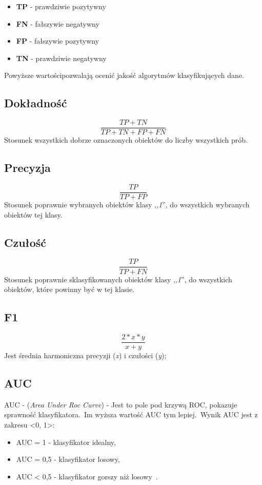     \begin{itemize}
        \item  \textbf{TP} - prawdziwie pozytywny
        \item \textbf{FN} - fałszywie negatywny
        \item \textbf{FP} - fałszywie pozytywny
        \item \textbf{TN} - prawdziwie negatywny
    \end{itemize}
Powyższe wartościpozwalają ocenić jakość algorytmów klasyfikujących dane.

\subsection{Dokładność}
\begin{equation}\label{math:acc}
    \frac{TP + TN}{TP + TN + FP + FN}
\end{equation}
Stosunek wszystkich dobrze oznaczonych obiektów do liczby wszystkich prób.

\subsection{Precyzja}
\begin{equation}\label{math:prec}
    \frac{TP}{TP + FP}
\end{equation}
Stosunek poprawnie wybranych obiektów klasy ,,\textit{1}'', do wszystkich wybranych obiektów tej klasy.

\subsection{Czułość}
\begin{equation}\label{math:rec}
    \frac{TP}{TP + FN}
\end{equation}
Stosunek poprawnie sklasyfikowanych obiektów klasy ,,\textit{1}'', do wszystkich obiektów, które powinny być w tej klasie.

\subsection{F1}
\begin{equation}\label{math:f1}
   \frac{2*x*y}{x + y}
\end{equation}
Jest średnia harmoniczna precyzji (\textit{x}) i czułości (\textit{y});


\subsection{AUC}
AUC - (\textit{Area Under Roc Curve}) - Jest to pole pod krzywą ROC, pokazuje sprawność klasyfikatora.\ Im wyższa wartość AUC tym lepiej.\ Wynik AUC jest z zakresu <0, 1>:
\begin{itemize}
    \item AUC = 1 - klasyfikator idealny,
    \item AUC = 0,5 - klasyfikator losowy,
    \item AUC < 0,5 - klasyfikator gorszy niż losowy~\cite{Algolytics}.
\end{itemize}